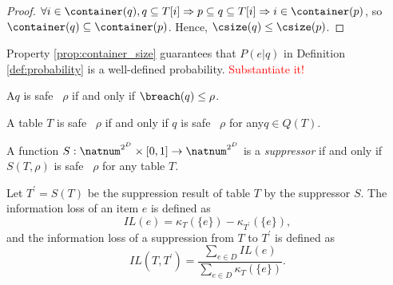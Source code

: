 \begin{proof}
  $\forall i\in\container(q), q\subseteq T[i]\Rightarrow p\subseteq q\subseteq T[i] \Rightarrow i\in\container(p)$,
  so $\container(q)\subseteq\container(p)$. Hence, $\csize(q)\leq \csize(p)$.
\end{proof}

Property \ref{prop:container_size} guarantees that $P(e|q)$ in Definition
\ref{def:probability} is a well-defined probability.
\textcolor{red}{Substantiate it!}

\begin{definition}%
\label{def:safety_qid}
A\qid $q$ is safe \wrt~$\rho$ if and only if $\breach(q)\leq\rho$.
\end{definition}

\begin{definition}%
\label{def:safety_table}
A table $T$ is safe \wrt~$\rho$ if and only if $q$ is safe \wrt~$\rho$ for any\qid $q\in Q(T)$.
\end{definition}

\begin{definition}[Suppressor]
\label{def:suppressor}
A function $S : \natnum^{2^D}\times[0,1]\rightarrow\natnum^{2^D}$ is a \emph{suppressor} if and only if $S(T,\rho)$ is safe \wrt~$\rho$ for any table $T$.
\end{definition}

\begin{definition}
\label{def:infoloss}
Let $T^\prime = S(T)$ be the suppression result of table $T$ by the suppressor $S$.
The information loss of an item $e$ is defined as
\[ IL(e) = \kappa_T(\{e\}) - \kappa_{T^\prime}(\{e\}), \]
and the information loss of a suppression from $T$ to $T^\prime$ is defined as
\[ IL(T,T^\prime) = \frac{\sum_{e\in D}IL(e)}{\sum_{e\in D}\kappa_T(\{e\})}. \]
\end{definition}

